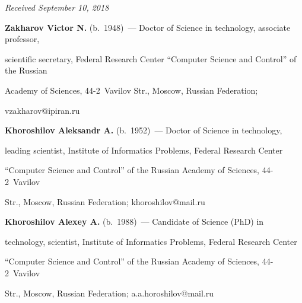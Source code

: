 \vspace*{-5pt}



\hfill{\small\textit{Received September 10, 2018}} 



\vspace*{-9pt}



\Contr



\vspace*{-2pt}



\noindent

\textbf{Zakharov Victor N.} (b.\ 1948)~---  Doctor of Science in technology, associate professor, 

scientific secretary, Federal Research Center ``Computer Science and Control'' of the Russian 

Academy of Sciences, 44-2~Vavilov Str., Moscow, Russian Federation; 

\mbox{vzakharov@ipiran.ru}



\vspace*{2pt}



\noindent

\textbf{Khoroshilov Aleksandr A.} (b.\ 1952)~---  Doctor of Science in technology, 

leading scientist, Institute of Informatics Problems, Federal Research Center 

``Computer Science and Control'' of the Russian Academy of Sciences, 44-2~Vavilov 

Str., Moscow, Russian Federation; \mbox{khoroshilov@mail.ru}



\vspace*{2pt}



\noindent

\textbf{Khoroshilov Alexey A.} (b.\ 1988)~---  Candidate of Science (PhD) in 

technology, scientist, Institute of Informatics Problems, Federal Research Center 

``Computer Science and Control'' of the Russian Academy of Sciences, 44-2~Vavilov 

Str., Moscow, Russian Federation; \mbox{a.a.horoshilov@mail.ru}

\label{end\stat}





\renewcommand{\bibname}{\protect\rm Литература}

